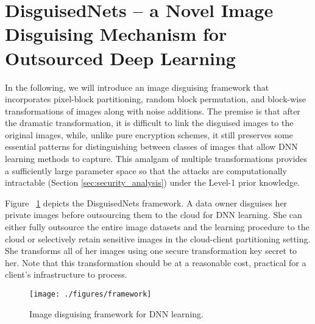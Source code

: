 \documentclass[conference]{IEEEtran}
\begin{document}
\section{DisguisedNets -- a Novel Image Disguising Mechanism for Outsourced Deep Learning}\label{sec:core}
In the following, we will introduce an image disguising framework that incorporates pixel-block partitioning, random block permutation, and block-wise transformations of images along with noise additions. The premise is that after the dramatic transformation, it is difficult to link the disguised images to the original images, while, unlike pure encryption schemes, it still preserves some essential patterns for distinguishing between classes of images that allow DNN learning methods to capture. This amalgam of multiple transformations provides a sufficiently large parameter space so that the attacks are computationally intractable (Section \ref{sec:security_analysis}) under the Level-1 prior knowledge. 

Figure ~\ref{fig:framework} depicts the DisguisedNets framework.  A data owner disguises her private images before outsourcing them to the cloud for DNN learning. She can either fully outsource the entire image datasets and the learning procedure to the cloud or selectively retain sensitive images in the cloud-client partitioning setting. She transforms all of her images using one secure transformation key secret to her. Note that this transformation should be at a reasonable cost, practical for a client's infrastructure to process. 

\begin{figure} [h]
\centering
\texttt{[image: ./figures/framework]}
\caption{Image disguising framework for DNN learning.}
\label{fig:framework}
\end{figure}
\end{document}
